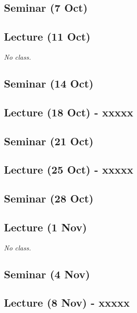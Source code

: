 \documentclass[12pt, a4paper]{article}
\begin{document}
\subsection*{Seminar (7 Oct)}

\subsection*{Lecture (11 Oct) {\color{red}{(No class)}}}

\textit{No class.}

\subsection*{Seminar (14 Oct)}

\subsection*{Lecture (18 Oct) - xxxxx}

\subsection*{Seminar (21 Oct)}

\subsection*{Lecture (25 Oct) - xxxxx}

\subsection*{Seminar (28 Oct)}

\subsection*{Lecture (1 Nov) {\color{red}{(No class)}}}

\textit{No class.}

\subsection*{Seminar (4 Nov)}

\subsection*{Lecture (8 Nov) - xxxxx}
\end{document}
